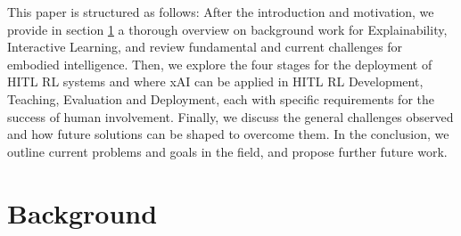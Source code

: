 \documentclass[twoside,11pt]{article}
\newcommand{\sd}[1]{\textcolor{red}{[#1 \textsc{--Srijita}]}}
\begin{document}




This paper is structured as follows: After the introduction and motivation, we provide in section \ref{sec:background} a thorough overview on background work for Explainability, Interactive Learning, and review fundamental and current challenges for embodied intelligence. Then, we explore the four stages for the deployment of HITL RL systems and where xAI can be applied in HITL RL Development, Teaching, Evaluation and Deployment, each with specific requirements for the success of human involvement. Finally, we discuss the general challenges observed and how future solutions can be shaped to overcome them. In the conclusion, we outline current problems and goals in the field, and propose further future work.

\section{Background}
\label{sec:background}
\end{document}
